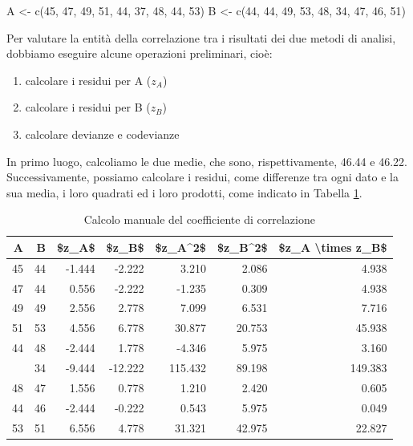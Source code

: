 \documentclass[a4paper,12pt,oneside]{book}
\providecommand{\tightlist}{%
  \setlength{\itemsep}{0pt}\setlength{\parskip}{0pt}}
\newenvironment{Shaded}{\begin{snugshade}}{\end{snugshade}}
\newcommand{\DecValTok}[1]{#1}
\newcommand{\OtherTok}[1]{#1}
\newcommand{\FunctionTok}[1]{#1}
\newcommand{\NormalTok}[1]{#1}
\begin{document}
\begin{Shaded}
\begin{Highlighting}[]
\NormalTok{A }\OtherTok{\textless{}{-}} \FunctionTok{c}\NormalTok{(}\DecValTok{45}\NormalTok{, }\DecValTok{47}\NormalTok{, }\DecValTok{49}\NormalTok{, }\DecValTok{51}\NormalTok{, }\DecValTok{44}\NormalTok{, }\DecValTok{37}\NormalTok{, }\DecValTok{48}\NormalTok{, }\DecValTok{44}\NormalTok{, }\DecValTok{53}\NormalTok{)}
\NormalTok{B }\OtherTok{\textless{}{-}} \FunctionTok{c}\NormalTok{(}\DecValTok{44}\NormalTok{, }\DecValTok{44}\NormalTok{, }\DecValTok{49}\NormalTok{, }\DecValTok{53}\NormalTok{, }\DecValTok{48}\NormalTok{, }\DecValTok{34}\NormalTok{, }\DecValTok{47}\NormalTok{, }\DecValTok{46}\NormalTok{, }\DecValTok{51}\NormalTok{)}
\end{Highlighting}
\end{Shaded}

Per valutare la entità della correlazione tra i risultati dei due metodi di analisi, dobbiamo eseguire alcune operazioni preliminari, cioè:

\begin{enumerate}
\def\labelenumi{\arabic{enumi}.}
\tightlist
\item
  calcolare i residui per A (\(z_A\))
\item
  calcolare i residui per B (\(z_B\))
\item
  calcolare devianze e codevianze
\end{enumerate}

In primo luogo, calcoliamo le due medie, che sono, rispettivamente, 46.44 e 46.22. Successivamente, possiamo calcolare i residui, come differenze tra ogni dato e la sua media, i loro quadrati ed i loro prodotti, come indicato in Tabella \ref{tab:tabName3}.

\begin{table}

\caption{\label{tab:tabName3}Calcolo manuale del coefficiente di correlazione}
\centering
\begin{tabular}[t]{rrrrrrr}
\toprule
A & B & \$z\_A\$ & \$z\_B\$ & \$z\_A\textasciicircum{}2\$ & \$z\_B\textasciicircum{}2\$ & \$z\_A \textbackslash{}times z\_B\$\\
\midrule
45 & 44 & -1.444 & -2.222 & 3.210 & 2.086 & 4.938\\
47 & 44 & 0.556 & -2.222 & -1.235 & 0.309 & 4.938\\
49 & 49 & 2.556 & 2.778 & 7.099 & 6.531 & 7.716\\
51 & 53 & 4.556 & 6.778 & 30.877 & 20.753 & 45.938\\
44 & 48 & -2.444 & 1.778 & -4.346 & 5.975 & 3.160\\
\addlinespace
37 & 34 & -9.444 & -12.222 & 115.432 & 89.198 & 149.383\\
48 & 47 & 1.556 & 0.778 & 1.210 & 2.420 & 0.605\\
44 & 46 & -2.444 & -0.222 & 0.543 & 5.975 & 0.049\\
53 & 51 & 6.556 & 4.778 & 31.321 & 42.975 & 22.827\\
\bottomrule
\end{tabular}
\end{table}
\end{document}
